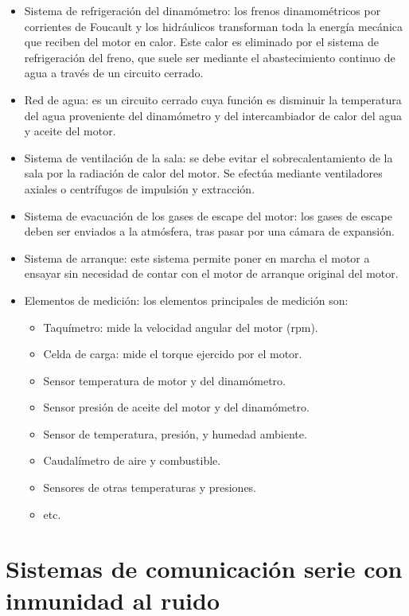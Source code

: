 \begin{itemize}
\item Sistema de refrigeración del dinamómetro: los frenos dinamométricos por corrientes de Foucault y los hidráulicos transforman toda la energía mecánica que reciben del motor en calor. Este calor es eliminado por el sistema de refrigeración del freno, que suele ser mediante el abastecimiento continuo de agua a través de un circuito cerrado.
\item Red de agua: es un circuito cerrado cuya función es disminuir la temperatura del agua proveniente del dinamómetro y del intercambiador de calor del agua y aceite del motor.
\item Sistema de ventilación de la sala: se debe evitar el sobrecalentamiento de la sala por la radiación de calor del motor. Se efectúa mediante ventiladores axiales o centrífugos de impulsión y extracción.
\item Sistema de evacuación de los gases de escape del motor: los gases de escape deben ser enviados a la atmósfera, tras pasar por una cámara de expansión.
\item Sistema de arranque: este sistema permite poner en marcha el motor a ensayar sin necesidad de contar con el motor de arranque original del motor.
\item Elementos de medición: los elementos principales de medición son:

\begin{itemize}
\item Taquímetro: mide la velocidad angular del motor (rpm).
\item Celda de carga: mide el torque ejercido por el motor.
\item Sensor temperatura de motor y del dinamómetro.
\item Sensor presión de aceite del motor y del dinamómetro.
\item Sensor de temperatura, presión, y humedad ambiente.
\item Caudalímetro de aire y combustible.
\item Sensores de otras temperaturas y presiones.
\item etc.
\end{itemize}

\end{itemize}



\section{Sistemas de comunicación serie con inmunidad al ruido} %
\label{sec:sistemas_de_comunicacion_serie_con_inmunidad_al_ruido}


